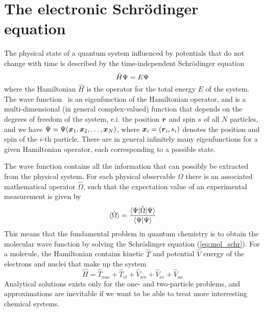 \section{The electronic Schr\"{o}dinger equation}\label{sec:schrodinger}
The physical state of a quantum system influenced by potentials that do not change
with time is described by the time-independent Schr\"{o}dinger equation 
\begin{equation}
    \label{eq:mol_schr}
    \hat{H}\Psi = E\Psi
\end{equation}
where the Hamiltonian $\hat{H}$ is the operator for the total energy $E$ of the system.
The wave function \Wavefunction\ is an eigenfunction of the Hamiltonian operator, 
and is a multi-dimensional (in general complex-valued) function that depends on the 
degrees of freedom of the system, e.i. the position $\boldsymbol r$ and spin $s$ of all $N$ 
particles, and we have $\Psi=\Psi(\boldsymbol x_1,\boldsymbol x_2,\dots,\boldsymbol x_N)$, 
where $\boldsymbol x_i=(\boldsymbol r_i,s_i)$ denotes the position and spin of the $i$-th particle. 
There are in general infinitely many eigenfunctions for a given Hamiltonian operator,
each corresponding to a possible state. 

The wave function contains all the information that can possibly be extracted from the 
physical system. For each physical observable $\Omega$ there is an associated mathematical 
operator $\hat{\Omega}$, such that the expectation value of an experimental measurement is 
given by
\begin{equation}
    \langle \hat{\Omega}\rangle = \frac{\langle\Psi|\hat{\Omega}|\Psi\rangle}
    {\langle\Psi|\Psi\rangle}
\end{equation}
This means that the fundamental problem in quantum chemistry is to obtain the molecular
wave function by solving the Schr\"{o}dinger equation (\ref{eq:mol_schr}). For a molecule,
the Hamiltonian contains kinetic $\hat{T}$ and potential $\hat{V}$ energy of the 
electrons and nuclei that make up the system
\begin{equation}
    \hat{H} = \hat{T}_{nuc} + \hat{T}_{el} + \hat{V}_{nn} + \hat{V}_{ee} + \hat{V}_{ne}
\end{equation}
Analytical solutions exists only for the one- and two-particle problems, and approximations 
are inevitable if we want to be able to treat more interresting chemical systems. 

